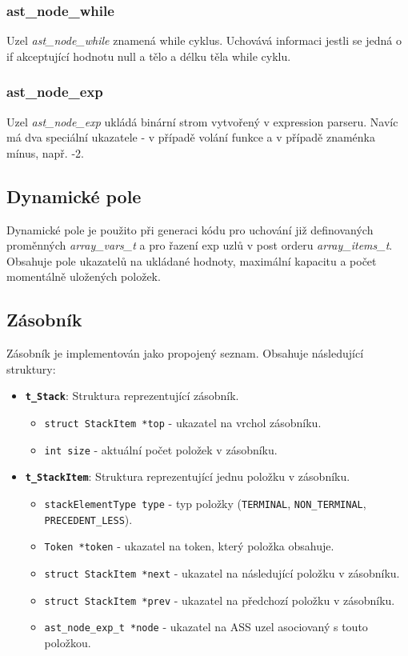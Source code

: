 \documentclass[a4paper, 12pt]{article}
\begin{document}
\subsubsection{ast\_node\_while}
Uzel \textit{ast\_node\_while} znamená while cyklus. Uchovává informaci jestli se jedná o if akceptující hodnotu null a tělo a délku těla while cyklu.
\subsubsection{ast\_node\_exp}
Uzel \textit{ast\_node\_exp} ukládá binární strom vytvořený v expression parseru. Navíc má dva speciální ukazatele - v případě volání funkce a v případě znaménka mínus, např. -2.

\subsection{Dynamické pole}
Dynamické pole je použito při generaci kódu pro uchování již definovaných proměnných \textit{array\_vars\_t} a pro řazení exp uzlů v post orderu \textit{array\_items\_t}. Obsahuje pole ukazatelů na ukládané hodnoty, maximální kapacitu a počet momentálně uložených položek.

\subsection{Zásobník}
Zásobník je implementován jako propojený seznam. Obsahuje následující struktury:

\begin{itemize}
    \item \textbf{\texttt{t\_Stack}}: Struktura reprezentující zásobník.
    \begin{itemize}
        \item \texttt{struct StackItem *top} - ukazatel na vrchol zásobníku.
        \item \texttt{int size} - aktuální počet položek v zásobníku.
    \end{itemize}
    \item \textbf{\texttt{t\_StackItem}}: Struktura reprezentující jednu položku v zásobníku.
    \begin{itemize}
        \item \texttt{stackElementType type} - typ položky (\texttt{TERMINAL}, \texttt{NON\_TERMINAL}, \texttt{PRECEDENT\_LESS}).
        \item \texttt{Token *token} - ukazatel na token, který položka obsahuje.
        \item \texttt{struct StackItem *next} - ukazatel na následující položku v zásobníku.
        \item \texttt{struct StackItem *prev} - ukazatel na předchozí položku v zásobníku.
        \item \texttt{ast\_node\_exp\_t *node} - ukazatel na ASS uzel asociovaný s touto položkou.
    \end{itemize}
\end{itemize}
\end{document}

